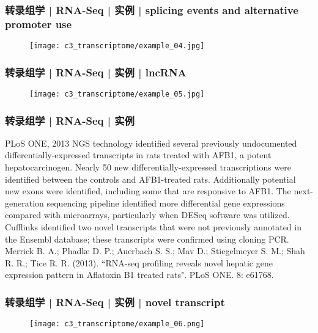 \begin{frame}
  \frametitle{转录组学 | RNA-Seq | 实例 | splicing events and alternative promoter use}
  \begin{figure}
    \centering
    \texttt{[image: c3\_transcriptome/example\_04.jpg]}
  \end{figure}
\end{frame}

\begin{frame}
  \frametitle{转录组学 | RNA-Seq | 实例 | lncRNA}
  \begin{figure}
    \centering
    \texttt{[image: c3\_transcriptome/example\_05.jpg]}
  \end{figure}
\end{frame}

\begin{frame}
  \frametitle{转录组学 | RNA-Seq | 实例}
  \begin{block}{PLoS ONE, 2013}
  NGS technology identified several previously undocumented differentially-expressed transcripts in rats treated with AFB1, a potent hepatocarcinogen. Nearly 50 new differentially-expressed transcriptions were identified between the controls and AFB1-treated rats. Additionally potential new exons were identified, including some that are responsive to AFB1. The next-generation sequencing pipeline identified more differential gene expressions compared with microarrays, particularly when DESeq software was utilized. Cufflinks identified two novel transcripts that were not previously annotated in the Ensembl database; these transcripts were confirmed using cloning PCR.\\
  \vspace{0.5em}
Merrick B. A.; Phadke D. P.; Auerbach S. S.; Mav D.; Stiegelmeyer S. M.; Shah R. R.; Tice R. R. (2013). ``RNA-seq profiling reveals novel hepatic gene expression pattern in Aflatoxin B1 treated rats". PLoS ONE. 8: e61768.
  \end{block}
\end{frame}

\begin{frame}
  \frametitle{转录组学 | RNA-Seq | 实例 | novel transcript}
  \begin{figure}
    \centering
    \texttt{[image: c3\_transcriptome/example\_06.png]}
  \end{figure}
\end{frame}

